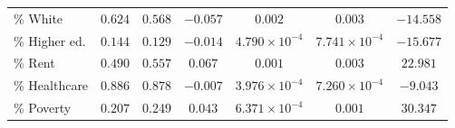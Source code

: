 \begin{table}[tbh]
\begin{threeparttable}
\begin{tabular}{lcccccc}
\% White                &                                                                                     $0.624$ &                                                                                     $0.568$ &                                                                                    $-0.057$ &                                                                                     $0.002$ &                                                                                     $0.003$ &                                                                                   $-14.558$ \\
\% Higher ed.           &                                                                                     $0.144$ &                                                                                     $0.129$ &                                                                                    $-0.014$ &                                                                      $4.790 \times 10^{-4}$ &                                                                      $7.741 \times 10^{-4}$ &                                                                                   $-15.677$ \\
\% Rent                 &                                                                                     $0.490$ &                                                                                     $0.557$ &                                                                                     $0.067$ &                                                                                     $0.001$ &                                                                                     $0.003$ &                                                                                    $22.981$ \\
\% Healthcare           &                                                                                     $0.886$ &                                                                                     $0.878$ &                                                                                    $-0.007$ &                                                                      $3.976 \times 10^{-4}$ &                                                                      $7.260 \times 10^{-4}$ &                                                                                    $-9.043$ \\
\% Poverty              &                                                                                     $0.207$ &                                                                                     $0.249$ &                                                                                     $0.043$ &                                                                      $6.371 \times 10^{-4}$ &                                                                                     $0.001$ &                                                                                    $30.347$ \\

\end{tabular}
\end{threeparttable}
\end{table}

